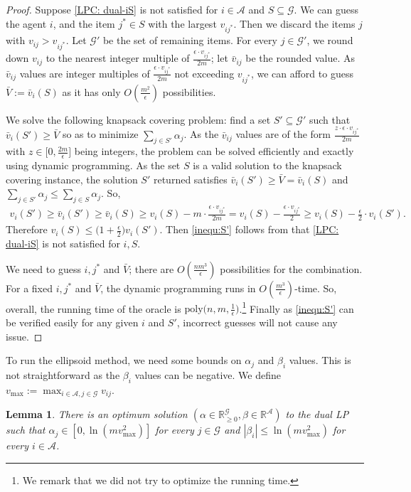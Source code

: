 \documentclass[10pt,a4paper]{article}
\newtheorem{lemma}[theorem]{Lemma}
\theoremstyle{definition}
\theoremstyle{plain}
\newcommand\calA{{\mathcal{A}}}
\newcommand\calG{{\mathcal{G}}}
\newcommand{\R}{{\mathbb{R}}}
\begin{document}
    \begin{proof}
        Suppose \eqref{LPC: dual-iS} is not satisfied for $i \in \calA$ and $S \subseteq \calG$. We can guess the agent $i$, and the item $j^* \in S$ with the largest $v_{ij^*}$. Then we discard the items $j$ with $v_{ij} > v_{ij^*}$. Let $\calG'$ be the set of remaining items.  For every $j \in \calG'$, we round down $v_{ij}$ to the nearest integer multiple of $\frac{\epsilon\cdot v_{ij^*}}{2m}$; let $\bar v_{ij}$ be the rounded value. As $\bar v_{ij}$ values are integer multiples of $\frac{\epsilon\cdot v_{ij^*}}{2m}$ not exceeding $v_{ij^*}$, we can afford to guess $\bar V := \bar v_i(S)$ as it has only $O(\frac{m^2}{\epsilon})$ possibilities. 

        We solve the following knapsack covering problem: find a set $S' \subseteq \calG'$ such that $\bar v_i(S') \geq \bar V$ so as to minimize $\sum_{j \in S'} \alpha_j$.  As the $\bar v_{ij}$ values are of the form $\frac{z \cdot \epsilon\cdot v_{ij^*}}{2m}$ with $z \in \Big[0, \frac{2m}{\epsilon}\Big]$ being integers, the problem can be solved efficiently and exactly using dynamic programming. As the set $S$ is a valid solution to the knapsack covering instance, the solution $S'$ returned satisfies $\bar v_i(S') \geq \bar V = \bar v_i(S)$ and $\sum_{j \in S'} \alpha_j \leq \sum_{j \in S} \alpha_j$. So, 
    \begin{align*}
        v_i(S') \geq \bar v_i(S') \geq \bar v_i(S) \geq v_i(S) - m\cdot \frac{\epsilon\cdot v_{ij^*}}{2m} = v_i(S) - \frac{\epsilon\cdot v_{ij^*}}{2} \geq v_i(S) - \frac{\epsilon}{2} \cdot v_i(S').
    \end{align*}
    Therefore $v_i(S) \leq \big(1 + \frac\epsilon2\big) v_i(S')$. Then \eqref{inequ:S'} follows from that \eqref{LPC: dual-iS} is not satisfied for $i, S$. 
        

    We need to guess $i, j^*$ and $\bar V$; there are $O(\frac{nm^3}{\epsilon})$ possibilities for the combination. For a fixed $i, j^*$ and $\bar V$, the dynamic programming runs in $O(\frac{m^3}{\epsilon})$-time. So, overall, the running time of the oracle is $\mathrm{poly}\big(n, m, \frac1\epsilon\big)$.\footnote{We remark that we did not try to optimize the running time.} Finally as \eqref{inequ:S'} can be verified easily for any given $i$ and $S'$, incorrect guesses will not cause any issue. 
    \end{proof}

    To run the ellipsoid method, we need some bounds on $\alpha_j$ and $\beta_i$ values. This is not straightforward as the $\beta_i$ values can be negative.  We define $v_{\max} := \max_{i \in \calA, j \in \calG} v_{ij}$.
    \begin{lemma}
        \label{lemma:bound-alpha-beta}
        There is an optimum solution $(\alpha \in \R_{\geq 0}^\calG, \beta \in \R^{\calA})$ to the dual LP such that $\alpha_j \in [0, \ln (m v_{\max}^2)]$ for every $j \in \calG$ and $|\beta_i| \leq \ln (mv_{\max}^2)$ for every $i \in \calA$.
    \end{lemma}
\end{document}

